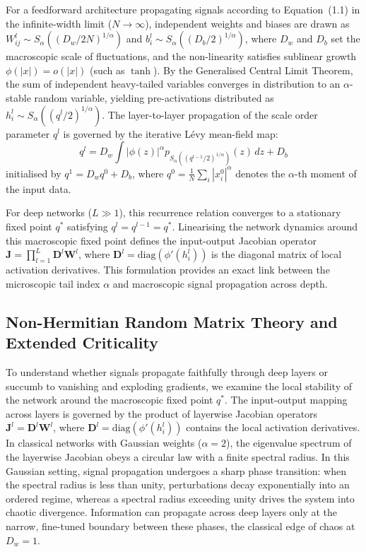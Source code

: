 \documentclass[11pt,oneside]{report}
\begin{document}
For a feedforward architecture propagating signals according to Equation~(1.1) in the infinite-width limit ($N \to \infty$), independent weights and biases are drawn as $W_{ij}^l \sim S_\alpha\left((D_w / 2N)^{1/\alpha}\right)$ and $b_i^l \sim S_\alpha\left((D_b / 2)^{1/\alpha}\right)$, where $D_w$ and $D_b$ set the macroscopic scale of fluctuations, and the non-linearity satisfies sublinear growth $\phi(|x|) = o(|x|)$ (such as $\tanh$). By the Generalised Central Limit Theorem, the sum of independent heavy-tailed variables converges in distribution to an $\alpha$-stable random variable, yielding pre-activations distributed as $h_i^l \sim S_\alpha\left((q^l / 2)^{1/\alpha}\right)$. The layer-to-layer propagation of the scale order parameter $q^l$ is governed by the iterative L{\'e}vy mean-field map:
\begin{equation}
	q^l = D_w \int |\phi(z)|^\alpha p_{S_\alpha((q^{l-1}/2)^{1/\alpha})}(z) \, dz + D_b
\end{equation}
initialised by $q^1 = D_w q^0 + D_b$, where $q^0 = \frac{1}{N}\sum_i |x_i^0|^\alpha$ denotes the $\alpha$-th moment of the input data. 

For deep networks ($L \gg 1$), this recurrence relation converges to a stationary fixed point $q^*$ satisfying $q^l = q^{l-1} = q^*$. Linearising the network dynamics around this macroscopic fixed point defines the input-output Jacobian operator $\mathbf{J} = \prod_{l=1}^L \mathbf{D}^l \mathbf{W}^l$, where $\mathbf{D}^l = \mathrm{diag}(\phi'(h_i^l))$ is the diagonal matrix of local activation derivatives. This formulation provides an exact link between the microscopic tail index $\alpha$ and macroscopic signal propagation across depth.
\subsection{Non-Hermitian Random Matrix Theory and Extended Criticality}
To understand whether signals propagate faithfully through deep layers or succumb to vanishing and exploding gradients, we examine the local stability of the network around the macroscopic fixed point $q^*$. The input-output mapping across layers is governed by the product of layerwise Jacobian operators $\mathbf{J}^l = \mathbf{D}^l \mathbf{W}^l$, where $\mathbf{D}^l = \mathrm{diag}(\phi'(h_i^l))$ contains the local activation derivatives. In classical networks with Gaussian weights ($\alpha = 2$), the eigenvalue spectrum of the layerwise Jacobian obeys a circular law with a finite spectral radius. In this Gaussian setting, signal propagation undergoes a sharp phase transition: when the spectral radius is less than unity, perturbations decay exponentially into an ordered regime, whereas a spectral radius exceeding unity drives the system into chaotic divergence. Information can propagate across deep layers only at the narrow, fine-tuned boundary between these phases, the classical edge of chaos at $D_w = 1$.
\end{document}
